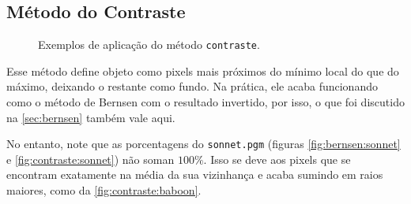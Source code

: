 \subsection{Método do Contraste}

\begin{figure}[H]
    \centering

    \caption{Exemplos de aplicação do método \texttt{contraste}.}
    \label{fig:contraste}
\end{figure}

Esse método define objeto como pixels mais próximos do mínimo local do que do máximo, deixando o restante como fundo. Na prática, ele acaba funcionando como o método de Bernsen com o resultado invertido, por isso, o que foi discutido na \cref{sec:bernsen} também vale aqui.

No entanto, note que as porcentagens do \texttt{sonnet.pgm} (figuras \ref{fig:bernsen:sonnet} e \ref{fig:contraste:sonnet}) não soman $100\%$. Isso se deve aos pixels que se encontram exatamente na média da sua vizinhança e acaba sumindo em raios maiores, como da \cref{fig:contraste:baboon}.
